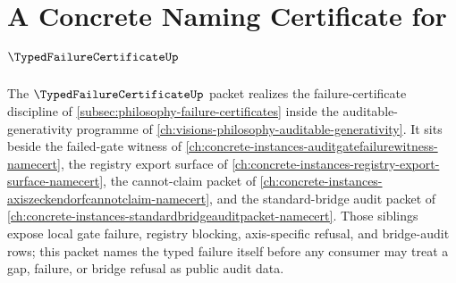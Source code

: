 \chapter{A Concrete Naming Certificate for $\TypedFailureCertificateUp$}
\label{ch:concrete-instances-typed-failure-certificate-namecert}

The $\TypedFailureCertificateUp$ packet realizes the failure-certificate discipline of \autoref{subsec:philosophy-failure-certificates} inside the auditable-generativity programme of \autoref{ch:visions-philosophy-auditable-generativity}. It sits beside the failed-gate witness of \autoref{ch:concrete-instances-auditgatefailurewitness-namecert}, the registry export surface of \autoref{ch:concrete-instances-registry-export-surface-namecert}, the cannot-claim packet of \autoref{ch:concrete-instances-axiszeckendorfcannotclaim-namecert}, and the standard-bridge audit packet of \autoref{ch:concrete-instances-standardbridgeauditpacket-namecert}. Those siblings expose local gate failure, registry blocking, axis-specific refusal, and bridge-audit rows; this packet names the typed failure itself before any consumer may treat a gap, failure, or bridge refusal as public audit data.

